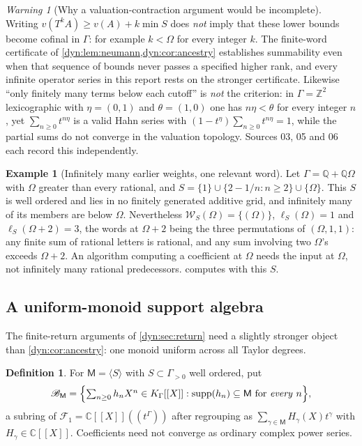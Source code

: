 \documentclass[11pt,letterpaper]{article}
\theoremstyle{definition}
\newtheorem{definition}[definition]{Definition}
\newtheorem{example}[example]{Example}
\theoremstyle{remark}
\newtheorem{warning}[warning]{Warning}
\newcommand{\C}{\mathbb C}
\newcommand{\Q}{\mathbb Q}
\newcommand{\Z}{\mathbb Z}
\newcommand{\BB}{\mathscr B}
\newcommand{\supp}{\operatorname{supp}}
\newcommand{\word}{\mathcal W}
\numberwithin{equation}{section}
\begin{document}
\begin{warning}[Why a valuation-contraction argument would be incomplete]
\label{dyn:warn:contraction}
Writing $v(T^{k}A)\ge v(A)+k\min S$ does \emph{not} imply that these lower
bounds become cofinal in $\Gamma$: for example $k<\Omega$ for every integer
$k$. The finite-word certificate of
\cref{dyn:lem:neumann,dyn:cor:ancestry} establishes summability even when
that sequence of bounds never passes a specified higher rank, and every
infinite operator series in this report rests on the stronger certificate.
Likewise ``only finitely many terms below each cutoff'' is \emph{not} the
criterion: in $\Gamma=\Z^{2}$ lexicographic with $\eta=(0,1)$ and
$\theta=(1,0)$ one has $n\eta<\theta$ for every integer $n$, yet
$\sum_{n\ge0}t^{n\eta}$ is a valid Hahn series with
$(1-t^{\eta})\sum_{n\ge0}t^{n\eta}=1$, while the partial sums do not
converge in the valuation topology. Sources 03, 05 and 06 each record this
independently.
\end{warning}

\begin{example}[Infinitely many earlier weights, one relevant word]
\label{dyn:ex:ranktwo}
Let $\Gamma=\Q+\Q\Omega$ with $\Omega$ greater than every rational, and
$S=\{1\}\cup\{2-1/n:n\ge2\}\cup\{\Omega\}$. This $S$ is well ordered and
lies in no finitely generated additive grid, and infinitely many of its
members are below $\Omega$. Nevertheless
$\word_S(\Omega)=\{(\Omega)\}$, $\ell_S(\Omega)=1$ and
$\ell_S(\Omega+2)=3$, the words at $\Omega+2$ being the three permutations
of $(\Omega,1,1)$: any finite sum of rational letters is rational, and any
sum involving two $\Omega$'s exceeds $\Omega+2$. An algorithm computing a
coefficient at $\Omega$ needs the input at $\Omega$, not infinitely many
rational predecessors.  computes with this $S$.
\end{example}

\subsection{A uniform-monoid support algebra}
\label{dyn:subsec:BM}

The finite-return arguments of \cref{dyn:sec:return} need a slightly
stronger object than \cref{dyn:cor:ancestry}: one monoid uniform across all
Taylor degrees.

\begin{definition}\label{dyn:def:BM}
For $\mathsf M=\langle S\rangle$ with $S\subset\Gamma_{>0}$ well ordered,
put
\[
 \BB_{\mathsf M}=\Bigl\{\textstyle\sum_{n\ge0}h_nX^{n}\in K_\Gamma[[X]]:
 \supp(h_n)\subseteq\mathsf M\ \text{for \emph{every}}\ n\Bigr\},
\]
a subring of $\mathcal F_1=\C[[X]]((t^{\Gamma}))$ after regrouping as
$\sum_{\gamma\in\mathsf M}H_\gamma(X)t^{\gamma}$ with
$H_\gamma\in\C[[X]]$. Coefficients need not converge as ordinary complex
power series.
\end{definition}
\end{document}
